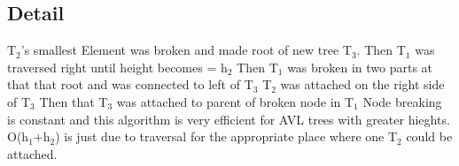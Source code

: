 \documentclass[11pt]{article}
\begin{document}
\subsection{Detail}
\label{sec:org4c50244}
T\(_{\text{2}}\)'s smallest Element was broken and made root of new tree T\(_{\text{3}}\).
Then T\(_{\text{1}}\) was traversed right until height becomes = h\(_{\text{2}}\)
Then T\(_{\text{1}}\) was broken in two parts at that that root and was connected to left of T\(_{\text{3}}\)
T\(_{\text{2}}\) was attached on the right side of T\(_{\text{3}}\)
Then that T\(_{\text{3}}\) was attached to parent of broken node in T\(_{\text{1}}\)
Node breaking is constant and this algorithm is very efficient for AVL trees with greater hieghts.
O(h\(_{\text{1}}\)+h\(_{\text{2}}\)) is just due to traversal for the appropriate place where one T\(_{\text{2}}\) could be attached.
\end{document}
